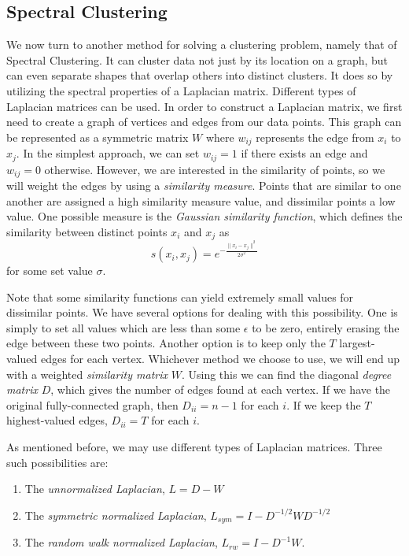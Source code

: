 \subsection*{Spectral Clustering}
We now turn to another method for solving a clustering problem, namely that of Spectral Clustering.
It can cluster data not just by its location on a graph, but can even separate shapes that overlap others into distinct clusters.
It does so by utilizing the spectral properties of a Laplacian matrix.
Different types of Laplacian matrices can be used.
In order to construct a Laplacian matrix, we first need to create a graph of vertices and edges from our data points.
This graph can be represented as a symmetric matrix $W$ where $w_{ij}$ represents the edge from $x_i$ to $x_j$.
In the simplest approach, we can set $w_{ij} = 1$ if there exists an edge and $w_{ij} = 0$ otherwise.
However, we are interested in the similarity of points, so we will weight the edges by using a \emph{similarity measure}.
Points that are similar to one another are assigned a high similarity measure value, and dissimilar points a low value.
One possible measure is the \emph{Gaussian similarity function}, which defines the similarity between distinct points $x_i$ and $x_j$ as
\begin{equation*}
s(x_i,x_j) = e^{- \frac{\| x_i - x_j \| ^2}{2 \sigma ^2}}
\end{equation*}
for some set value $\sigma$.

Note that some similarity functions can yield extremely small values for dissimilar points.
We have several options for dealing with this possibility.
One is simply to set all values which are less than some $\epsilon$ to be zero, entirely erasing the edge between these two points.
Another option is to keep only the $T$ largest-valued edges for each vertex.
Whichever method we choose to use, we will end up with a weighted \emph{similarity matrix} $W$.
Using this we can find the diagonal \emph{degree matrix} $D$, which gives the number of edges found at each vertex.
If we have the original fully-connected graph, then $D_{ii} = n-1$ for each $i$.
If we keep the $T$ highest-valued edges, $D_{ii} = T$ for each $i$.

As mentioned before, we may use different types of Laplacian matrices.  Three such possibilities are:
\begin{enumerate}
    \item The \emph{unnormalized Laplacian}, $L = D - W$
    \item The \emph{symmetric normalized Laplacian}, $L_{sym} = I - D^{-1/2}WD^{-1/2}$
    \item The \emph{random walk normalized Laplacian}, $L_{rw} = I - D^{-1}W$.
 \end{enumerate}

